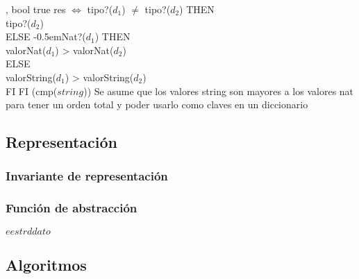 \operacion{$\bullet > \bullet$}
{, }
{bool}
{true}
{res $\iff$ \IFL tipo?($d_1$) $\neq$ tipo?($d_2$) THEN \\
    \hspace*{10.5em} tipo?($d_2$) \\
    \hspace*{9em} ELSE {\kern-0.5em\IFL Nat?($d_1$) THEN \\
    \hspace*{10.5em} valorNat($d_1$) > valorNat($d_2$) \\
    \hspace*{9em} ELSE \\
    \hspace*{10.5em} valorString($d_1$) > valorString($d_2$) \\
    \hspace*{9em} FI} FI }
{\bigo(cmp($string$))}
{}
{Se asume que los valores string son mayores a los valores nat para tener un orden total y poder usarlo como claves en un diccionario}

\subsection{Representación}


\subsubsection{Invariante de representación}


\subsubsection{Función de abstracción}

\begin{ABS}{$e$}{$estr$}{$d$}{$dato$}
\end{ABS}

\subsection{Algoritmos}

